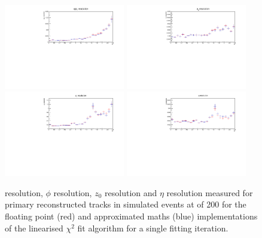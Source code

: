 \begin{figure}[htb]
\centering
\includegraphics[width=0.47\textwidth]{figs/tk-upgrade/results-chi2fitter/qOverPtResVsEta_It_1_ApproxVsExact.pdf}
\includegraphics[width=0.47\textwidth]{figs/tk-upgrade/results-chi2fitter/phi0ResVsEta_It_1_ApproxVsExact.pdf}
\\
\includegraphics[width=0.47\textwidth]{figs/tk-upgrade/results-chi2fitter/z0ResVsEta_It_1_ApproxVsExact.pdf}
\includegraphics[width=0.47\textwidth]{figs/tk-upgrade/results-chi2fitter/etaResVsEta_It_1_ApproxVsExact.pdf}
\caption{
\pt resolution, $\phi$ resolution, $z_{0}$ resolution and $\eta$ resolution measured for primary reconstructed tracks in simulated \ttbar events at \PU of 200 for the floating point (red) and approximated maths (blue) implementations of the linearised $\chi^{2}$ fit algorithm for a single fitting iteration.
}
\label{fig:chi2HelixParametersResVsEtaApproxVsExact}
\end{figure}

